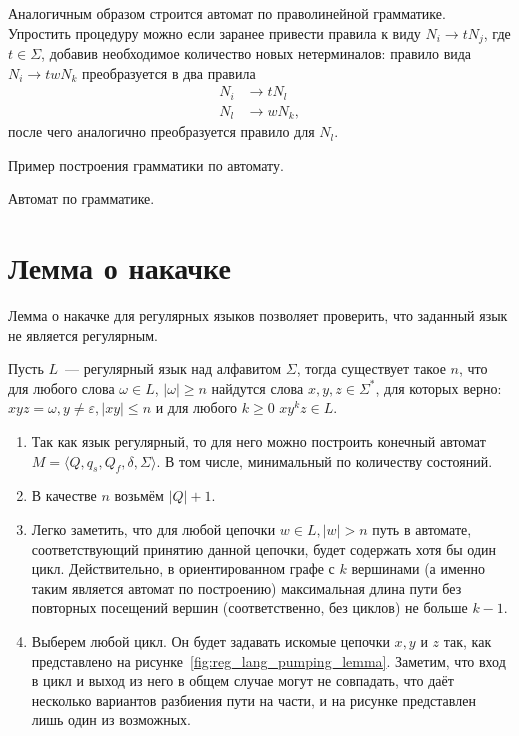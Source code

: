 Аналогичным образом строится автомат по праволинейной грамматике.
Упростить процедуру можно если заранее привести правила к виду $N_i \to tN_j$, где $t\in \Sigma$, добавив необходимое количество новых нетерминалов:
правило вида $N_i \to twN_k$ преобразуется в два правила
\begin{align*}
    N_i & \to tN_l  \\
    N_l & \to wN_k,
\end{align*}
после чего аналогично преобразуется правило для $N_l$.

Пример построения грамматики по автомату.

Автомат по грамматике.

\section{Лемма о накачке}

Лемма о накачке для регулярных языков позволяет проверить, что заданный язык не является регулярным.

\begin{lemma}
    Пусть $L$~--- регулярный язык над алфавитом $\Sigma$, тогда существует такое $n$, что для любого слова $\omega \in L$, $|\omega| \geq n$ найдутся слова $x,y,z\in \Sigma^*$, для которых верно: $xyz = \omega, y\neq \varepsilon,|xy|\leq n$ и для любого $k \geq 0$  $xy^kz \in L$.
\end{lemma}

\begin{proofSketch}
    \begin{enumerate}
        \item Так как язык регулярный, то для него можно построить конечный автомат $M = \langle Q, q_s,Q_f, \delta, \Sigma \rangle$.
              В том числе, минимальный по количеству состояний.
        \item В качестве $n$ возьмём $|Q| + 1$.
        \item Легко заметить, что для любой цепочки $w \in L, |w| > n$ путь в автомате, соответствующий принятию данной цепочки, будет содержать хотя бы один цикл.
              Действительно, в ориентированном графе с $k$ вершинами (а именно таким является автомат по построению) максимальная длина пути без повторных посещений вершин (соответственно, без циклов) не больше $k - 1$.
        \item Выберем любой цикл. Он будет задавать искомые цепочки $x, y$ и $z$ так, как представлено на рисунке~\ref{fig:reg_lang_pumping_lemma}.
              Заметим, что вход в цикл и выход из него в общем случае могут не совпадать, что даёт несколько вариантов разбиения пути на части, и на рисунке представлен лишь один из возможных.
              \qedhere
    \end{enumerate}
\end{proofSketch}

